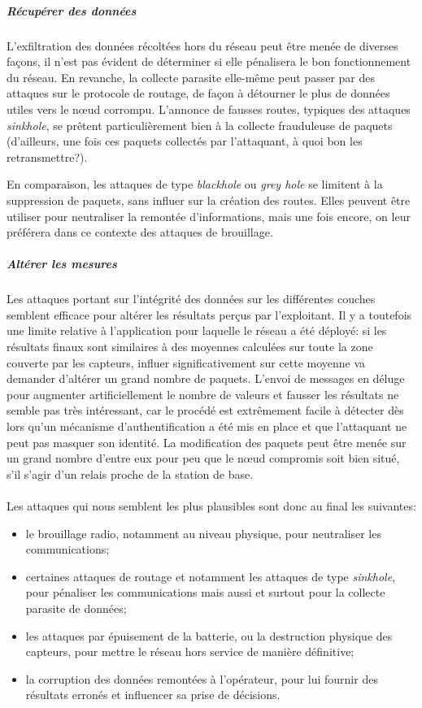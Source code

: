             \subparagraph{Récupérer des données}
L'exfiltration des données récoltées hors du réseau peut être menée de diverses façons, il n'est pas évident de déterminer si elle pénalisera le bon fonctionnement du réseau.
En revanche, la collecte parasite elle-même peut passer par des attaques sur le protocole de routage, de façon à détourner le plus de données utiles vers le nœud corrompu.
L'annonce de fausses routes, typiques des attaques \textit{sinkhole}, se prêtent particulièrement bien à la collecte frauduleuse de paquets (d'ailleurs, une fois ces paquets collectés par l'attaquant, à quoi bon les retransmettre?).

En comparaison, les attaques de type \textit{blackhole} ou \textit{grey hole} se limitent à la suppression de paquets, sans influer sur la création des routes.
Elles peuvent être utiliser pour neutraliser la remontée d'informations, mais une fois encore, on leur préférera dans ce contexte des attaques de brouillage.

            \subparagraph{Altérer les mesures}
Les attaques portant sur l'intégrité des données sur les différentes couches semblent efficace pour altérer les résultats perçus par l'exploitant.
Il y a toutefois une limite relative à l'application pour laquelle le réseau a été déployé: si les résultats finaux sont similaires à des moyennes calculées sur toute la zone couverte par les capteurs, influer significativement sur cette moyenne va demander d'altérer un grand nombre de paquets.
L'envoi de messages en déluge pour augmenter artificiellement le nombre de valeurs et fausser les résultats ne semble pas très intéressant, car le procédé est extrêmement facile à détecter dès lors qu'un mécanisme d'authentification a été mis en place et que l'attaquant ne peut pas masquer son identité.
La modification des paquets peut être menée sur un grand nombre d'entre eux pour peu que le nœud compromis soit bien situé, \cad s'il s'agir d'un relais proche de la station de base.

        \paragraph{}
Les attaques qui nous semblent les plus plausibles sont donc au final les suivantes:
\begin{itemize}
	\item le brouillage radio, notamment au niveau physique, pour neutraliser les communications;
    \item certaines attaques de routage et notamment les attaques de type \textit{sinkhole}, pour pénaliser les communications mais aussi et surtout pour la collecte parasite de données;
    \item les attaques par épuisement de la batterie, ou la destruction physique des capteurs, pour mettre le réseau hors service de manière définitive;
	\item la corruption des données remontées à l'opérateur, pour lui fournir des résultats erronés et influencer sa prise de décisions.
\end{itemize}

